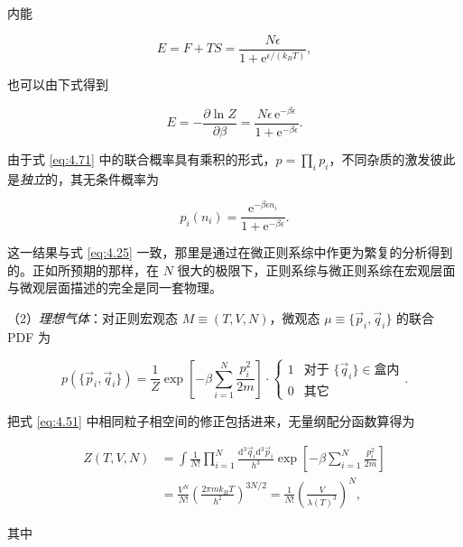 内能

\begin{equation}\label{eq:4.75}
  E=F+TS=\frac{N\epsilon}{1+\mathrm{e}^{\epsilon/(k_BT)}},
\end{equation}

也可以由下式得到

\begin{equation}\label{eq:4.76}
  E=-\frac{\partial\ln Z}{\partial\beta}=\frac{N\epsilon\,\mathrm{e}^{-\beta\epsilon}}{1+\mathrm{e}^{-\beta\epsilon}}.
\end{equation}

由于式 \eqref{eq:4.71} 中的联合概率具有乘积的形式，$p=\prod_ip_i$，不同杂质的激发彼此是\emph{独立}的，其无条件概率为

\begin{equation}\label{eq:4.77}
  p_i(n_i)=\frac{\mathrm{e}^{-\beta\epsilon n_i}}{1+\mathrm{e}^{-\beta\epsilon}}.
\end{equation}

这一结果与式 \eqref{eq:4.25} 一致，那里是通过在微正则系综中作更为繁复的分析得到的。正如所预期的那样，在 $N$ 很大的极限下，正则系综与微正则系综在宏观层面与微观层面描述的完全是同一套物理。

（2）\emph{理想气体}：对正则宏观态 $M\equiv(T,V,N)$，微观态 $\mu\equiv\{\vec p_i,\vec q_i\}$ 的联合 PDF 为

\begin{equation}\label{eq:4.78}
  p(\{\vec p_i,\vec q_i\})=\frac{1}{Z}\exp\left[-\beta\sum_{i=1}^N\frac{p_i^2}{2m}\right]\cdot
  \begin{cases}1 & \text{对于 }\{\vec q_i\}\in\text{盒内}\\ 0 & \text{其它}\end{cases}.
\end{equation}

把式 \eqref{eq:4.51} 中相同粒子相空间的修正包括进来，无量纲配分函数算得为

\begin{equation}\label{eq:4.79}
  \begin{aligned}
    Z(T,V,N)&=\int\frac{1}{N!}\prod_{i=1}^N\frac{\mathrm{d}^3\vec q_i\mathrm{d}^3\vec p_i}{h^3}\exp\left[-\beta\sum_{i=1}^N\frac{p_i^2}{2m}\right]\\
    &=\frac{V^N}{N!}\left(\frac{2\pi mk_BT}{h^2}\right)^{3N/2}=\frac{1}{N!}\left(\frac{V}{\lambda(T)^3}\right)^N,
  \end{aligned}
\end{equation}

其中

